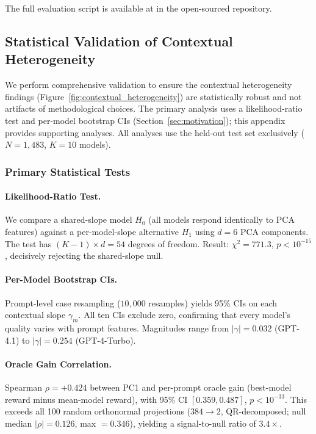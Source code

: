 The full evaluation script is available at  in the open-sourced repository.


\subsection{Statistical Validation of Contextual Heterogeneity}
\label{app:validation_methodology}

We perform comprehensive validation to ensure the contextual heterogeneity findings (Figure~\ref{fig:contextual_heterogeneity}) are statistically robust and not artifacts of methodological choices.
The primary analysis uses a likelihood-ratio test and per-model bootstrap CIs (Section~\ref{sec:motivation}); this appendix provides supporting analyses.
All analyses use the held-out test set exclusively ($N{=}1{,}483$, $K{=}10$ models).

\subsubsection{Primary Statistical Tests}

\paragraph{Likelihood-Ratio Test.}
We compare a shared-slope model $H_0$ (all models respond identically to PCA features) against a per-model-slope alternative $H_1$ using $d{=}6$ PCA components.
The test has $(K{-}1) \times d = 54$ degrees of freedom.
Result: $\chi^2 = 771.3$, $p < 10^{-15}$, decisively rejecting the shared-slope null.

\paragraph{Per-Model Bootstrap CIs.}
Prompt-level case resampling ($10{,}000$ resamples) yields 95\% CIs on each contextual slope $\gamma_m$.
All ten CIs exclude zero, confirming that every model's quality varies with prompt features.
Magnitudes range from $|\gamma| = 0.032$ (GPT-4.1) to $|\gamma| = 0.254$ (GPT-4-Turbo).

\paragraph{Oracle Gain Correlation.}
Spearman $\rho = {+}0.424$ between PC1 and per-prompt oracle gain (best-model reward minus mean-model reward), with 95\% CI $[0.359, 0.487]$, $p < 10^{-33}$.
This exceeds all 100 random orthonormal projections ($384 \to 2$, QR-decomposed; null median $|\rho| = 0.126$, max $= 0.346$), yielding a signal-to-null ratio of $3.4\times$.

